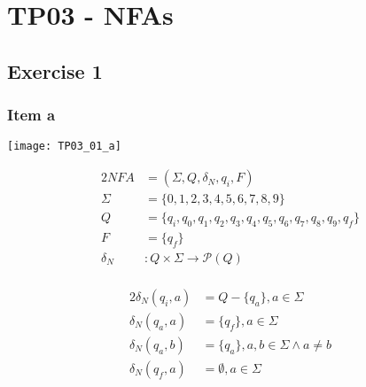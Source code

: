 \setcounter{section}{2}
\section{TP03 - NFAs}
{
\renewcommand{\thesubsubsection}{\thesubsection\alph{subsubsection}}
\subsection{Exercise 1}
\subsubsection{Item a}
\begin{center} \texttt{[image: TP03\_01\_a]} \end{center}
\begin{center}
	\begin{minipage}[c]{0.45\textwidth}
		\begin{alignat*}{2}
			NFA    &= (\Sigma, Q, \delta_N, q_i, F)\\
			\Sigma &= \{0,1,2,3,4,5,6,7,8,9\}\\
			Q      &= \{q_i,q_0,q_1,q_2,q_3,q_4,q_5,q_6,q_7,q_8,q_9,q_f\}\\
			F      &= \{q_f\}\\
			\delta_N &\colon Q \times \Sigma \rightarrow \mathscr{P}(Q)\\
		\end{alignat*}
	\end{minipage}
	\begin{minipage}[c]{0.40\textwidth}
		\begin{alignat*}{2}
			\delta_N(q_i,a)&=Q-\{q_a\}, a \in \Sigma \\
			\delta_N(q_a,a)&=\{q_f\}  , a \in \Sigma \\
			\delta_N(q_a,b)&=\{q_a\}  , a,b \in \Sigma \wedge a \neq b\\
			\delta_N(q_f,a)&=\emptyset, a \in \Sigma
		\end{alignat*}
	\end{minipage}
\end{center}
}
